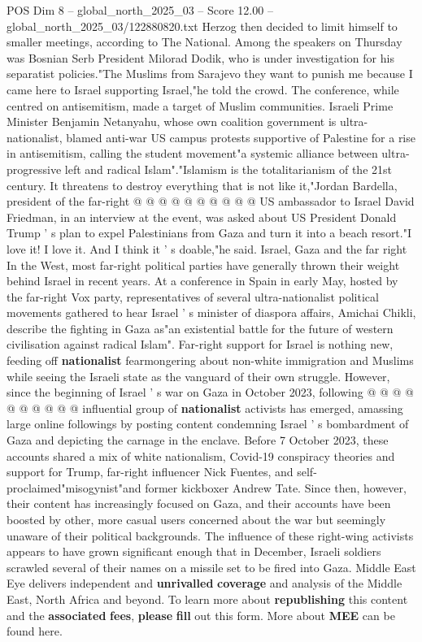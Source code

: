\begin{textsample}{POS Dim 8 – global\_north\_2025\_03 – Score 12.00 – global\_north\_2025\_03/122880820.txt}
Herzog then decided to limit himself to smaller meetings, according to The National.
Among the speakers on Thursday was Bosnian Serb President Milorad Dodik, who is under investigation for his separatist policies."The Muslims from Sarajevo they want to punish me because I came here to Israel supporting Israel,"he told the crowd.
The conference, while centred on antisemitism, made a target of Muslim communities.
Israeli Prime Minister Benjamin Netanyahu, whose own coalition government is ultra-nationalist, blamed anti-war US campus protests supportive of Palestine for a rise in antisemitism, calling the student movement"a systemic alliance between ultra-progressive left and radical Islam"."Islamism is the totalitarianism of the 21st century.
It threatens to destroy everything that is not like it,"Jordan Bardella, president of the far-right @ @ @ @ @ @ @ @ @ @ US ambassador to Israel David Friedman, in an interview at the event, was asked about US President Donald Trump ' s plan to expel Palestinians from Gaza and turn it into a beach resort."I love it!
I love it.
And I think it ' s doable,"he said.
Israel, Gaza and the far right In the West, most far-right political parties have generally thrown their weight behind Israel in recent years.
At a conference in Spain in early May, hosted by the far-right Vox party, representatives of several ultra-nationalist political movements gathered to hear Israel ' s minister of diaspora affairs, Amichai Chikli, describe the fighting in Gaza as"an existential battle for the future of western civilisation against radical Islam".
Far-right support for Israel is nothing new, feeding off \textbf{nationalist} fearmongering about non-white immigration and Muslims while seeing the Israeli state as the vanguard of their own struggle.
However, since the beginning of Israel ' s war on Gaza in October 2023, following @ @ @ @ @ @ @ @ @ @ influential group of \textbf{nationalist} activists has emerged, amassing large online followings by posting content condemning Israel ' s bombardment of Gaza and depicting the carnage in the enclave.
Before 7 October 2023, these accounts shared a mix of white nationalism, Covid-19 conspiracy theories and support for Trump, far-right influencer Nick Fuentes, and self-proclaimed"misogynist"and former kickboxer Andrew Tate.
Since then, however, their content has increasingly focused on Gaza, and their accounts have been boosted by other, more casual users concerned about the war but seemingly unaware of their political backgrounds.
The influence of these right-wing activists appears to have grown significant enough that in December, Israeli soldiers scrawled several of their names on a missile set to be fired into Gaza.
Middle East Eye delivers independent and \textbf{unrivalled} \textbf{coverage} and analysis of the Middle East, North Africa and beyond.
To learn more about \textbf{republishing} this content and the \textbf{associated} \textbf{fees}, \textbf{please} \textbf{fill} out this form.
More about \textbf{MEE} can be found here.

\end{textsample}
